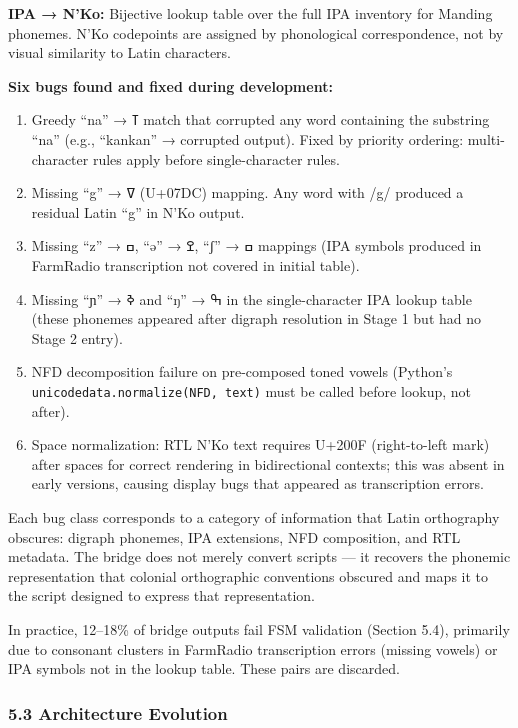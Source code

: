 \documentclass[
]{article}
\providecommand{\tightlist}{%
  \setlength{\itemsep}{0pt}\setlength{\parskip}{0pt}}
\begin{document}
\textbf{IPA → N'Ko:} Bijective lookup table over the full IPA inventory
for Manding phonemes. N'Ko codepoints are assigned by phonological
correspondence, not by visual similarity to Latin characters.

\textbf{Six bugs found and fixed during development:}

\begin{enumerate}
\def\labelenumi{\arabic{enumi}.}
\tightlist
\item
  Greedy ``na'' → ߠ match that corrupted any word containing the
  substring ``na'' (e.g., ``kankan'' → corrupted output). Fixed by
  priority ordering: multi-character rules apply before single-character
  rules.
\item
  Missing ``g'' → ߜ (U+07DC) mapping. Any word with /g/ produced a
  residual Latin ``g'' in N'Ko output.
\item
  Missing ``z'' → ߛ, ``ə'' → ߐ, ``ʃ'' → ߛ mappings (IPA symbols produced
  in FarmRadio transcription not covered in initial table).
\item
  Missing ``ɲ'' → ߢ and ``ŋ'' → ߒ in the single-character IPA lookup
  table (these phonemes appeared after digraph resolution in Stage 1 but
  had no Stage 2 entry).
\item
  NFD decomposition failure on pre-composed toned vowels (Python's
  \texttt{unicodedata.normalize(\textquotesingle{}NFD\textquotesingle{},\ text)}
  must be called before lookup, not after).
\item
  Space normalization: RTL N'Ko text requires U+200F (right-to-left
  mark) after spaces for correct rendering in bidirectional contexts;
  this was absent in early versions, causing display bugs that appeared
  as transcription errors.
\end{enumerate}

Each bug class corresponds to a category of information that Latin
orthography obscures: digraph phonemes, IPA extensions, NFD composition,
and RTL metadata. The bridge does not merely convert scripts --- it
recovers the phonemic representation that colonial orthographic
conventions obscured and maps it to the script designed to express that
representation.

In practice, 12--18\% of bridge outputs fail FSM validation (Section
5.4), primarily due to consonant clusters in FarmRadio transcription
errors (missing vowels) or IPA symbols not in the lookup table. These
pairs are discarded.

\subsubsection{5.3 Architecture Evolution}\label{architecture-evolution}
\end{document}
